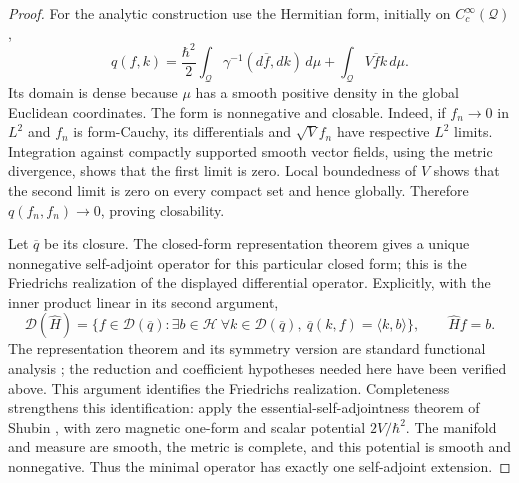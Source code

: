 \begin{proof}
For the analytic construction use the Hermitian form, initially on
\(C_c^\infty(\mathcal Q)\),
\begin{equation}
 q(f,k)=\frac{\hbar^2}{2}\int_{\mathcal Q}
       \gamma^{-1}(d\overline f,dk)\,d\mu
       +\int_{\mathcal Q}V\overline f k\,d\mu.
 \label{eq:whitney-interacting-quantum-form}
\end{equation}
Its domain is dense because \(\mu\) has a smooth positive density
in the global Euclidean coordinates. The form is nonnegative and
closable. Indeed, if \(f_n\to0\) in \(L^2\) and \(f_n\)
is form-Cauchy, its differentials and \(\sqrt V f_n\) have
respective \(L^2\) limits. Integration against compactly supported
smooth vector fields, using the metric divergence, shows that the first
limit is zero. Local boundedness of \(V\) shows that the second limit
is zero on every compact set and hence globally. Therefore
\(q(f_n,f_n)\to0\), proving closability.

Let \(\overline q\) be its closure. The closed-form representation
theorem gives a unique nonnegative self-adjoint operator for this
particular closed form; this is the Friedrichs realization of the
displayed differential operator. Explicitly, with the inner product
linear in its second argument,
\[
 \mathcal D(\widehat H)=\{f\in\mathcal D(\overline q):
 \exists b\in\mathcal H\ \forall k\in\mathcal D(\overline q),\
       \overline q(k,f)=\langle k,b\rangle\},\qquad
 \widehat Hf=b.
\]
The representation theorem and its symmetry version are standard
functional analysis \cite{IbortLledoPerezPardo2014}; the reduction and
coefficient hypotheses needed here have been verified above. This
argument identifies the Friedrichs realization. Completeness strengthens
this identification: apply the essential-self-adjointness theorem of
Shubin \cite[Theorem~1.1]{Shubin2001}, with zero magnetic one-form and
scalar potential \(2V/\hbar^2\). The manifold and measure are smooth,
the metric is complete, and this potential is smooth and nonnegative.
Thus the minimal operator has exactly one self-adjoint extension.


\end{proof}
